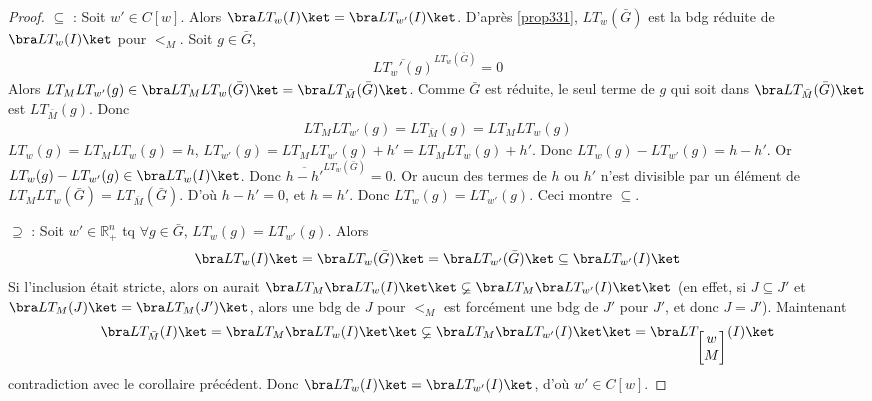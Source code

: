         \begin{proof}
            \item $\subseteq$ : Soit $w' \in C[w]$. Alors $\bra LT_w(I) \ket = \bra LT_{w'} (I) \ket$. D'après \ref{prop331}, $LT_w(\bar G)$ est la bdg réduite de $\bra LT_w(I) \ket$ pour $<_M$. Soit $g \in \bar G$,
            \begin{align*}
                \overline{LT_w'(g)}^{LT_w(\bar G)} = 0
            \end{align*}
            Alors $LT_M LT_{w'}(g) \in \bra LT_M LT_w(\bar G) \ket = \bra LT_{\bar M}(\bar G) \ket$. Comme $\bar G$ est réduite, le seul terme de $g$ qui soit dans $\bra LT_{\bar M}(\bar G) \ket$ est $LT_{\bar M}(g)$. Donc
            \begin{align*}
                LT_M LT_{w'}(g) = LT_{\bar M}(g) = LT_M LT_w (g)
            \end{align*}
            $LT_w(g) = LT_M LT_w(g) = h$, $LT_{w'}(g) = LT_M LT_{w'}(g) + h' = LT_M LT_{w}(g) + h'$. Donc $LT_w(g) - LT_{w'}(g) = h - h'$. Or $LT_w(g) - LT_{w'}(g) \in \bra LT_w(I) \ket$. Donc $\overline{h - h'}^{LT_w(\bar G)} = 0$. Or aucun des termes de $h$ ou $h'$ n'est divisible par un élément de $LT_M LT_w(\bar G) = LT_{\bar M}(\bar G)$. D'où $h - h' = 0$, et $h=h'$. Donc $LT_w(g) = LT_{w'}(g)$. Ceci montre $\subseteq$.
            \item $\supseteq$ : Soit $w' \in \mathbb{R}^n_+$ tq $\forall g \in \bar G$, $LT_w(g) = LT_{w'}(g)$. Alors 
            \begin{align*}
                \bra LT_w(I) \ket = \bra LT_w(\bar G) \ket = \bra LT_{w'}(\bar G) \ket \subseteq \bra LT_{w'}(I) \ket 
            \end{align*}
            Si l'inclusion était stricte, alors on aurait $\bra LT_M \bra LT_w(I) \ket \ket \varsubsetneq \bra LT_M \bra LT_{w'}(I) \ket \ket$ (en effet, si $J \subseteq J'$ et $\bra LT_M(J) \ket = \bra LT_M(J') \ket$, alors une bdg de $J$ pour $<_M$ est forcément une bdg de $J'$ pour $J'$, et donc $J = J'$). Maintenant
            \begin{align*}
                \bra LT_{\bar M}(I) \ket = \bra LT_M \bra LT_w(I) \ket \ket \varsubsetneq \bra LT_M \bra LT_{w'}(I) \ket \ket = \bra LT_{\begin{bmatrix} w \\ M \end{bmatrix}}(I) \ket
            \end{align*}
            contradiction avec le corollaire précédent. Donc $\bra LT_w(I) \ket = \bra LT_{w'}(I) \ket$, d'où $w' \in C[w]$.
        \end{proof}
